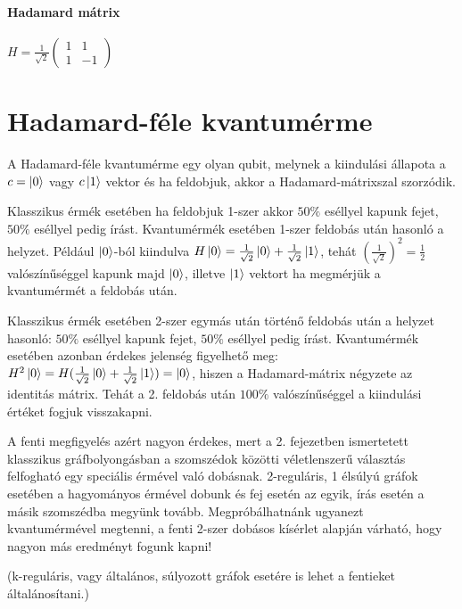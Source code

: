 \paragraph{Hadamard mátrix}

\begin{center}
  $H = \frac{1}{\sqrt{2}}\begin{pmatrix}
      1 & 1  \\
      1 & -1
    \end{pmatrix}$
\end{center}

\section{Hadamard-féle kvantumérme}

A Hadamard-féle kvantumérme egy olyan qubit, melynek a kiindulási állapota a $c
  = \ket{0}$ vagy $c \ket{1}$ vektor és ha feldobjuk, akkor a Hadamard-mátrixszal
szorzódik.

Klasszikus érmék esetében ha feldobjuk 1-szer akkor $50\%$ eséllyel kapunk
fejet, $50\%$ eséllyel pedig írást. Kvantumérmék esetében 1-szer feldobás után
hasonló a helyzet. Például $\ket{0}$-ból kiindulva $H\ket{0} =
  \frac{1}{\sqrt{2}}\ket{0} + \frac{1}{\sqrt{2}}\ket{1}$, tehát
$(\frac{1}{\sqrt{2}})^2 = \frac{1}{2}$ valószínűséggel kapunk majd $\ket{0}$,
illetve $\ket{1}$ vektort ha megmérjük a kvantumérmét a feldobás után.

Klasszikus érmék esetében 2-szer egymás után történő feldobás után a helyzet
hasonló: $50\%$ eséllyel kapunk fejet, $50\%$ eséllyel pedig írást.
Kvantumérmék esetében azonban érdekes jelenség figyelhető meg: $H^2\ket{0} =
  H(\frac{1}{\sqrt{2}}\ket{0} + \frac{1}{\sqrt{2}}\ket{1}) = \ket{0}$, hiszen a
Hadamard-mátrix négyzete az identitás mátrix. Tehát a 2. feldobás után $100\%$
valószínűséggel a kiindulási értéket fogjuk visszakapni.

A fenti megfigyelés azért nagyon érdekes, mert a 2. fejezetben ismertetett
klasszikus gráfbolyongásban a szomszédok közötti véletlenszerű választás
felfogható egy speciális érmével való dobásnak. 2-reguláris, 1 élsúlyú gráfok
esetében a hagyományos érmével dobunk és fej esetén az egyik, írás esetén a
másik szomszédba megyünk tovább. Megpróbálhatnánk ugyanezt kvantumérmével
megtenni, a fenti 2-szer dobásos kísérlet alapján várható, hogy nagyon más
eredményt fogunk kapni!

(k-reguláris, vagy általános, súlyozott gráfok esetére is lehet a fentieket
általánosítani.)

